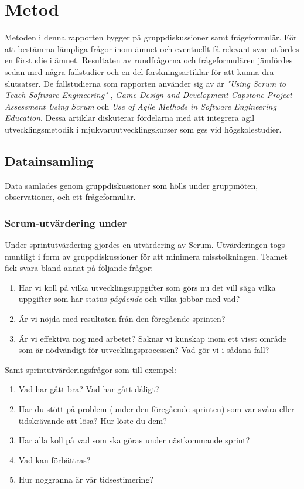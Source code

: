 \section{Metod} \label{sec:Lieth_Wahid-method}
Metoden i denna rapporten bygger på gruppdiskussioner samt frågeformulär. För att bestämma lämpliga frågor inom ämnet och eventuellt  få relevant svar utfördes en förstudie i ämnet. Resultaten av rundfrågorna och frågeformulären jämfördes sedan med några  fallstudier och en del forskningsartiklar för att kunna dra slutsatser. De fallstudierna som rapporten använder sig av är \textit{"Using Scrum to Teach Software Engineering"} \cite{Usingscr27:online}, \textit{ Game Design and Development Capstone Project Assessment Using Scrum} \cite{GameDesign} och \textit{Use of Agile Methods in Software Engineering Education}\cite{UseofAgi59:online}. Dessa artiklar diskuterar fördelarna med att integrera agil utvecklingsmetodik i mjukvaruutvecklingskurser som ges vid högskolestudier.  
\subsection{Datainsamling}\label{ds}
Data samlades genom gruppdiskussioner som hölls under gruppmöten, observationer, och ett frågeformulär. 
\subsubsection {Scrum-utvärdering under } \label{Lieth:scrumU}
Under sprintutvärdering gjordes en utvärdering av Scrum. Utvärderingen togs muntligt i form av gruppdiskussioner för att minimera misstolkningen. Teamet fick svara bland annat på följande frågor:
\begin{enumerate}
	\item Har vi koll på vilka utvecklingsuppgifter som görs nu det vill säga vilka uppgifter som har status \textit{pågående} och vilka jobbar med vad? 
	\item Är vi nöjda med resultaten från den föregående sprinten?
	\item Är vi effektiva nog med arbetet? Saknar vi kunskap inom ett visst område som är nödvändigt för utvecklingsprocessen? Vad gör vi i sådana fall? \label{f3}
\end{enumerate} 
Samt sprintutvärderingsfrågor som till exempel:
\begin{enumerate}
	\item Vad har gått bra? Vad har gått dåligt?
	\item Har du stött på problem (under den föregående sprinten) som var svåra eller tidskrävande att lösa? Hur löste du dem?
	\item Har alla koll på vad som ska göras under nästkommande sprint?
	\item Vad kan förbättras?
	\item Hur noggranna är vår tidsestimering?
\end{enumerate} 

